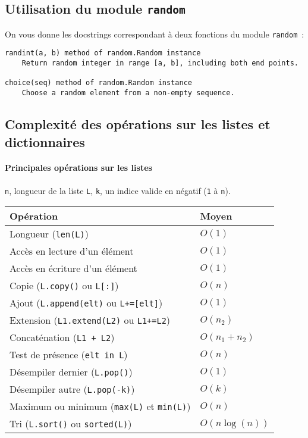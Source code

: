 \subsection*{Utilisation du module \texttt{random}}

On vous donne les docstrings correspondant à deux fonctions du module \texttt{random}~: 

\begin{lstlisting}
randint(a, b) method of random.Random instance
    Return random integer in range [a, b], including both end points.
	
choice(seq) method of random.Random instance
    Choose a random element from a non-empty sequence.
\end{lstlisting}

\subsection*{Complexité des opérations sur les listes et dictionnaires}

\paragraph*{Principales opérations sur les listes}

\texttt{n}, longueur de la liste \texttt{L}, \texttt{k}, un indice valide en négatif (\texttt{1} à \texttt{n}).

\begin{longtable}{|m{9cm}|m{2.1cm}|} \hline
	\bf \centering Opération & \bf \centering Moyen \tabularnewline
	\hline
	\endhead
	Longueur (\texttt{len(L)}) &  $O(1)$ \tabularnewline
	\hline
	Accès en lecture d'un élément &  $O(1)$ \tabularnewline
	\hline
	Accès en écriture d'un élément &  $O(1)$ \tabularnewline
	\hline
	Copie (\texttt{L.copy()} ou \texttt{L[:]}) & $O(n)$ \tabularnewline
	\hline
	Ajout (\texttt{L.append(elt)} ou \texttt{L+=[elt]}) & $O(1)$ \tabularnewline
	\hline
	Extension (\texttt{L1.extend(L2)} ou \texttt{L1+=L2}) & $O(n_2)$ \tabularnewline
	\hline
	Concaténation (\texttt{L1 + L2}) &  $O(n_1 + n_2)$ \tabularnewline
	\hline
	Test de présence (\texttt{elt in L}) & $O(n)$ \tabularnewline
	\hline
	Désempiler dernier (\texttt{L.pop()}) &  $O(1)$ \tabularnewline
	\hline
	Désempiler autre (\texttt{L.pop(-k)}) &  $O(k)$ \tabularnewline
	\hline
	Maximum ou minimum (\texttt{max(L)} et \texttt{min(L)}) &  $O(n)$ \tabularnewline
	\hline
	Tri (\texttt{L.sort()} ou \texttt{sorted(L)}) &  $O(n \log(n))$ \tabularnewline
	\hline
\end{longtable}

